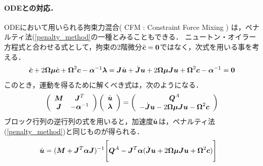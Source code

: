 \documentclass{jsarticle}
\begin{document}
\paragraph{ODEとの対応．}
ODEにおいて用いられる拘束力混合( CFM : Constraint Force Mixing ) は，ペナルティ法(\ref{penalty_method}の一種とみることもできる．
ニュートン・オイラー方程式と合わせる式として，拘束の2階微分$\ddot{\vc}=\0$ではなく，次式を用いる事を考える．
\begin{align*}
 \ddot{\vc} + 2\vOmega\vmu \dot{\vc} + \vOmega^2\vc - \valpha^{-1}\vlambda
=\vJ\dot{\vu}+\dot{\vJ}\vu  +2\vOmega\vmu\vJ\vu + \vOmega^2\vc - \valpha^{-1}
=\0
\end{align*}
このとき，運動を得るために解くべき式は，次のようになる．
\begin{align}
   \left(
    \begin{array}{cc}
       \vM   & \vJ^T\\
       \vJ   & -\valpha^{-1}
    \end{array}
   \right)
   \left(
    \begin{array}{c}
       \dot{\vu}\\
       \vlambda
    \end{array}
   \right)
=
   \left(
    \begin{array}{c}
       \vQ^A\\
       -\dot{\vJ}\vu-2\vOmega\vmu\vJ\vu-\vOmega^2\vc
    \end{array}
   \right)\label{cfm_method}
\end{align}
ブロック行列の逆行列の式を用いると，加速度$\dot{\vu}$は，ペナルティ法(\ref{penalty_method})と同じものが得られる．
\begin{align*}
\dot{\vu} &= (\vM+\vJ^T\valpha\vJ)^{-1}\Biggl[\vQ^A-\vJ^T\valpha(\dot{\vJ}\vu+2\vOmega\vmu\vJ\vu+\vOmega^2\vc) \Biggr]
\end{align*}
\end{document}
